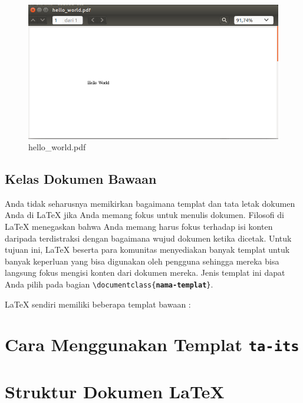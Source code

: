 \documentclass{ta-its}
\begin{document}
		\begin{figure}[h]
			\centering
			\includegraphics[width=\linewidth]{contoh_img/hello_world.pdf.png}
			\caption{hello\_world.pdf}
			\label{gambarHelloWorldPDF}
		\end{figure}
        
        \subsection{Kelas Dokumen Bawaan}
        
        Anda tidak seharusnya memikirkan bagaimana templat dan tata letak dokumen Anda di \LaTeX{} jika Anda memang fokus untuk menulis dokumen. Filosofi di \LaTeX{} menegaskan bahwa Anda memang harus fokus terhadap isi konten daripada terdistraksi dengan bagaimana wujud dokumen ketika dicetak. Untuk tujuan ini, \LaTeX{} beserta para komunitas menyediakan banyak templat untuk banyak keperluan yang bisa digunakan oleh pengguna sehingga mereka bisa langsung fokus mengisi konten dari dokumen mereka. Jenis templat ini dapat Anda pilih pada bagian \texttt{\textbackslash{}documentclass\{\textbf{nama-templat}\}}.
        
        \LaTeX{} sendiri memiliki beberapa templat bawaan :
        \begin{itemize}
        
        \end{itemize}
        
        \section{Cara Menggunakan Templat \texttt{ta-its}}
        \section{Struktur Dokumen \LaTeX{}}
\end{document}
